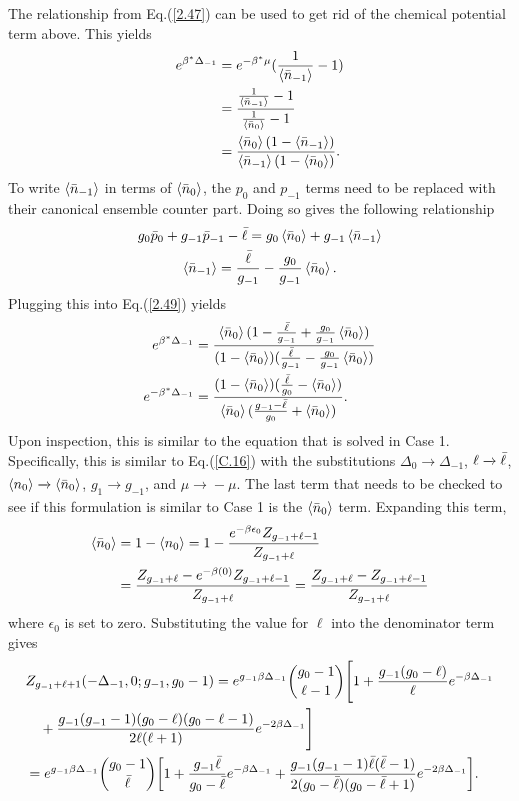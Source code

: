The relationship from Eq.\@ (\ref{2.47}) can be used to get rid of the chemical potential term above. This yields
\begin{align}
    e^{\beta^*\Delta_{-1}}&=e^{-\beta^*\mu}(\frac{1}{\left<{\Bar{n}_{-1}}\right>}-1)\nonumber\\
    &=\frac{\frac{1}{\left<{\Bar{n}_{-1}}\right>}-1}{\frac{1}{\left<{\Bar{n}_0}\right>}-1}\nonumber\\
    &=\frac{\left<{\Bar{n}_0}\right>(1-\left<{\Bar{n}_{-1}}\right>)}{\left<{\Bar{n}_{-1}}\right>(1-\left<{\Bar{n}_0}\right>)}.
\end{align}
To write $\left<{\Bar{n}_{-1}}\right>$ in terms of $\left<{\Bar{n}_0}\right>$, the $p_0$ and $p_{-1}$ terms  need to be replaced with their canonical ensemble counter part. Doing so gives the following relationship
\begin{gather}
    g_0\Bar{p}_0+g_{-1}\Bar{p}_{-1}-\Bar{\ell}=g_0\left<{\Bar{n}_0}\right>+g_{-1}\left<{\Bar{n}_{-1}}\right>\\
    \left<{\Bar{n}_{-1}}\right>=\frac{\Bar{\ell}}{g_{-1}}-\frac{g_0}{g_{-1}}\left<{\Bar{n}_0}\right>.
\end{gather}
Plugging this into Eq.\@ (\ref{2.49}) yields
\begin{align}
    e^{\beta^*\Delta_{-1}}&=\frac{\left<{\Bar{n}_0}\right>(1-\frac{\Bar{\ell}}{g_{-1}}+\frac{g_0}{g_{-1}}\left<{\Bar{n}_0}\right>)}{(1-\left<{\Bar{n}_0}\right>)(\frac{\Bar{\ell}}{g_{-1}}-\frac{g_0}{g_{-1}}\left<{\Bar{n}_0}\right>)}\\
    e^{-\beta^*\Delta_{-1}}&=\frac{(1-\left<{\Bar{n}_0}\right>)(\frac{\Bar{\ell}}{g_0}-\left<{\Bar{n}_0}\right>)}{\left<{\Bar{n}_0}\right>(\frac{g_{-1}-\Bar{\ell}}{g_0}+\left<{\Bar{n}_0}\right>)}.
\end{align}
Upon inspection, this is similar to the equation that is solved in Case 1. Specifically, this is similar to Eq.\@ (\ref{C.16}) with the substitutions $\Delta_0\xrightarrow[]{}\Delta_{-1}$, $\ell\xrightarrow[]{}\Bar{\ell}$, $\left<{n_0}\right>\xrightarrow[]{}\left<{\Bar{n}_0}\right>$, $g_1\xrightarrow[]{}g_{-1}$, and $\mu \xrightarrow[]{}-\mu$. The last term that needs to be checked to see if this formulation is similar to Case 1 is the $\left<{\Bar{n}_0}\right>$ term. Expanding this term, 
\begin{align}
    \left<{\Bar{n}_0}\right>&=1-\left<{n_0}\right>=1-\frac{e^{-\beta\epsilon_0}Z_{g_{-1}+\ell-1}}{Z_{g_{-1}+\ell}}\\
    &=\frac{Z_{g_{-1}+\ell}-e^{-\beta (0)}Z_{g_{-1}+\ell-1}}{Z_{g_{-1}+\ell}}=\frac{Z_{g_{-1}+\ell}-Z_{g_{-1}+\ell-1}}{Z_{g_{-1}+\ell}} \label{2.56}
\end{align}
where $\epsilon_0$ is set to zero. Substituting the value for $\ell$ into the denominator term gives
\begin{align}
    &Z_{g_{-1}+\ell+1}(-\Delta_{-1},0;g_{-1},g_0-1)=e^{g_{-1}\beta\Delta_{-1}}{g_0-1 \choose \ell-1}\Biggr[1+\frac{g_{-1}(g_0-\ell)}{\ell}e^{-\beta\Delta_{-1}}\nonumber\\
    &\quad+\frac{g_{-1}(g_{-1}-1)(g_0-\ell)(g_0-\ell-1)}{2\ell(\ell+1)}e^{-2\beta\Delta_{-1}}\Biggr]\nonumber\\
    &=e^{g_{-1}\beta\Delta_{-1}}{g_0-1 \choose \Bar{\ell}}\qty[1+\frac{g_{-1}\Bar{\ell}}{g_0-\bar{\ell}}e^{-\beta\Delta_{-1}}+\frac{g_{-1}(g_{-1}-1)\Bar{\ell}(\Bar{\ell}-1)}{2(g_0-\Bar{\ell})(g_0-\Bar{\ell}+1)}e^{-2\beta\Delta_{-1}}].
\end{align}
